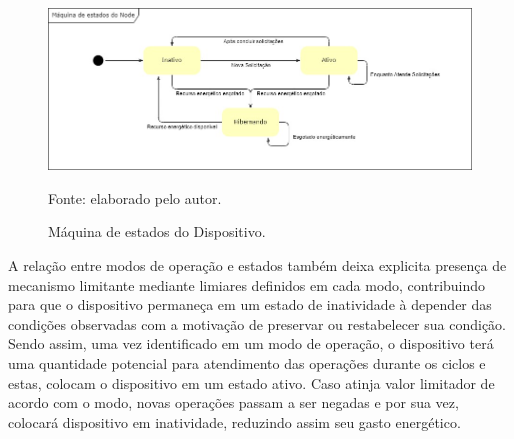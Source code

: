 \begin{figure}[H]
	\centering
	
	\caption{Máquina de estados do Dispositivo.}
	\label{fig:cap6maquinaestados}
	\noindent\includegraphics[width=0.75\linewidth]{Imagens/cap6/cap6maquinaestados.jpg} 
	
	Fonte: elaborado pelo autor.
\end{figure}

A relação entre modos de operação e estados também deixa explicita presença de mecanismo limitante mediante limiares definidos em cada modo, contribuindo para que o dispositivo permaneça em um estado de inatividade à depender das condições observadas com a motivação de preservar ou restabelecer sua condição. Sendo assim, uma vez identificado em um modo de operação, o dispositivo terá uma quantidade potencial para atendimento das operações durante os ciclos e estas, colocam o dispositivo em um estado ativo. Caso atinja valor limitador de acordo com o modo, novas operações passam a ser negadas e por sua vez, colocará dispositivo em inatividade, reduzindo assim seu gasto energético.

